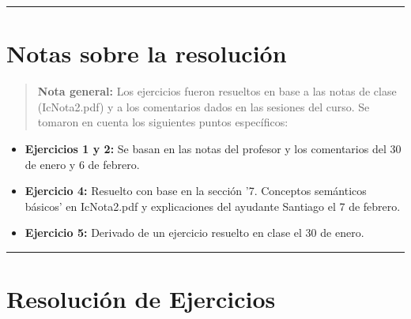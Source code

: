 \documentclass[11pt,letterpaper]{article}
\begin{document}
\bigskip
\hrule height 0.1pt
\bigskip

\section*{Notas sobre la resolución}

\begin{quote}
  \textbf{Nota general:}  
  Los ejercicios fueron resueltos en base a las notas de clase (IcNota2.pdf) y a los comentarios dados en las sesiones del curso. Se tomaron en cuenta los siguientes puntos específicos:  
\end{quote}

\begin{itemize}
   \item \textbf{Ejercicios 1 y 2:} Se basan en las notas del profesor y los comentarios del 30 de enero y 6 de febrero.  
   \item \textbf{Ejercicio 4:} Resuelto con base en la sección '7. Conceptos semánticos básicos' en IcNota2.pdf y explicaciones del ayudante Santiago el 7 de febrero.  
   \item \textbf{Ejercicio 5:} Derivado de un ejercicio resuelto en clase el 30 de enero.  
\end{itemize}

\bigskip
\hrule height 0.1pt
\bigskip

\section*{Resolución de Ejercicios}
\end{document}
